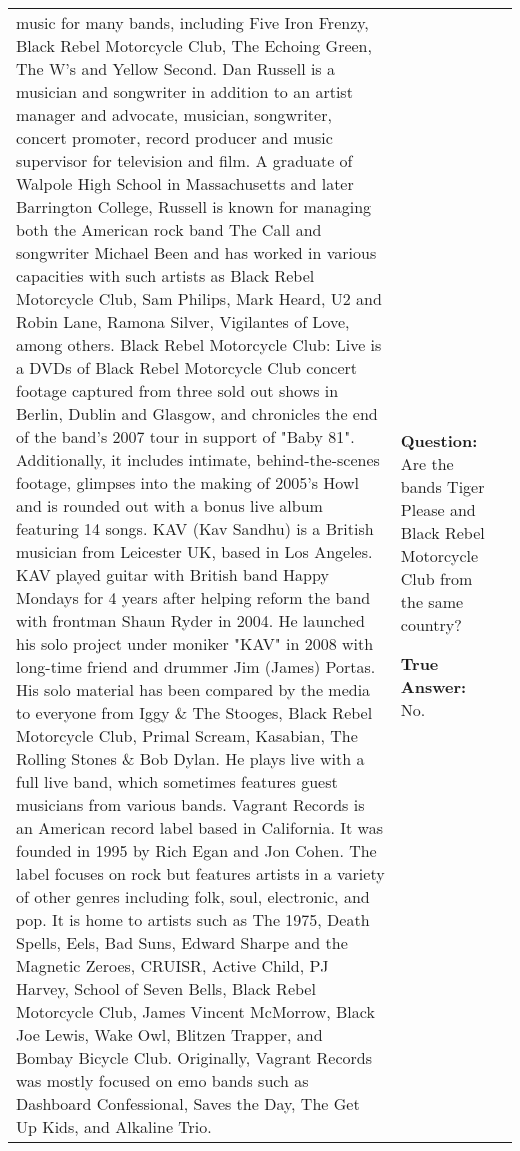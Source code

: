 \begin{table*}[t]
{\begin{tabular}{p{} p{} p{}}
music for many bands, including Five Iron Frenzy, Black Rebel Motorcycle Club, The Echoing Green, The W's and Yellow Second. Dan Russell is a musician and songwriter in addition to an artist manager and advocate, musician, songwriter, concert promoter, record producer and music supervisor for television and film. A graduate of Walpole High School in Massachusetts and later Barrington College, Russell is known for managing both the American rock band The Call and songwriter Michael Been and has worked in various capacities with such artists as Black Rebel Motorcycle Club, Sam Philips, Mark Heard, U2 and Robin Lane, Ramona Silver, Vigilantes of Love, among others. Black Rebel Motorcycle Club: Live is a DVDs of Black Rebel Motorcycle Club concert footage captured from three sold out shows in Berlin, Dublin and Glasgow, and chronicles the end of the band's 2007 tour in support of "Baby 81". Additionally, it includes intimate, behind-the-scenes footage, glimpses into the making of 2005's Howl and is rounded out with a bonus live album featuring 14 songs. KAV (Kav Sandhu) is a British musician from Leicester UK, based in Los Angeles. KAV played guitar with British band Happy Mondays for 4 years after helping reform the band with frontman Shaun Ryder in 2004. He launched his solo project under moniker "KAV" in 2008 with long-time friend and drummer Jim (James) Portas. His solo material has been compared by the media to everyone from Iggy \& The Stooges, Black Rebel Motorcycle Club, Primal Scream, Kasabian, The Rolling Stones \& Bob Dylan. He plays live with a full live band, which sometimes features guest musicians from various bands. Vagrant Records is an American record label based in California. It was founded in 1995 by Rich Egan and Jon Cohen. The label focuses on rock but features artists in a variety of other genres including folk, soul, electronic, and pop. It is home to artists such as The 1975, Death Spells, Eels, Bad Suns, Edward Sharpe and the Magnetic Zeroes, CRUISR, Active Child, PJ Harvey, School of Seven Bells, Black Rebel Motorcycle Club, James Vincent McMorrow, Black Joe Lewis, Wake Owl, Blitzen Trapper, and Bombay Bicycle Club. Originally, Vagrant Records was mostly focused on emo bands such as Dashboard Confessional, Saves the Day, The Get Up Kids, and Alkaline Trio.
& 
{\scriptsize
    \textbf{Question:} Are the bands Tiger Please and Black Rebel Motorcycle Club from the same country?\vspace{1mm}
    
    \textbf{True Answer:} No. \vspace{1mm}
    
}
\end{tabular}}
\end{table*}
